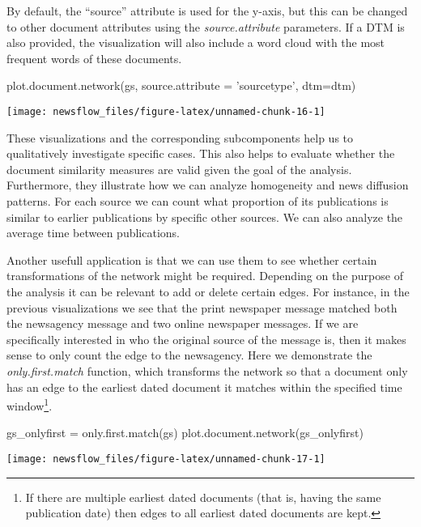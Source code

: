 By default, the ``source'' attribute is used for the y-axis, but this
can be changed to other document attributes using the
\emph{source.attribute} parameters. If a DTM is also provided, the
visualization will also include a word cloud with the most frequent
words of these documents.

\begin{Schunk}
\begin{Sinput}
plot.document.network(gs, source.attribute = 'sourcetype', dtm=dtm)
\end{Sinput}

\texttt{[image: newsflow\_files/figure-latex/unnamed-chunk-16-1]} \end{Schunk}

These visualizations and the corresponding subcomponents help us to
qualitatively investigate specific cases. This also helps to evaluate
whether the document similarity measures are valid given the goal of the
analysis. Furthermore, they illustrate how we can analyze homogeneity
and news diffusion patterns. For each source we can count what
proportion of its publications is similar to earlier publications by
specific other sources. We can also analyze the average time between
publications.

Another usefull application is that we can use them to see whether
certain transformations of the network might be required. Depending on
the purpose of the analysis it can be relevant to add or delete certain
edges. For instance, in the previous visualizations we see that the
print newspaper message matched both the newsagency message and two
online newspaper messages. If we are specifically interested in who the
original source of the message is, then it makes sense to only count the
edge to the newsagency. Here we demonstrate the \emph{only.first.match}
function, which transforms the network so that a document only has an
edge to the earliest dated document it matches within the specified time
window\footnote{If there are multiple earliest dated documents (that is,
  having the same publication date) then edges to all earliest dated
  documents are kept.}.

\begin{Schunk}
\begin{Sinput}
gs_onlyfirst = only.first.match(gs)
plot.document.network(gs_onlyfirst)
\end{Sinput}

\texttt{[image: newsflow\_files/figure-latex/unnamed-chunk-17-1]} \end{Schunk}

